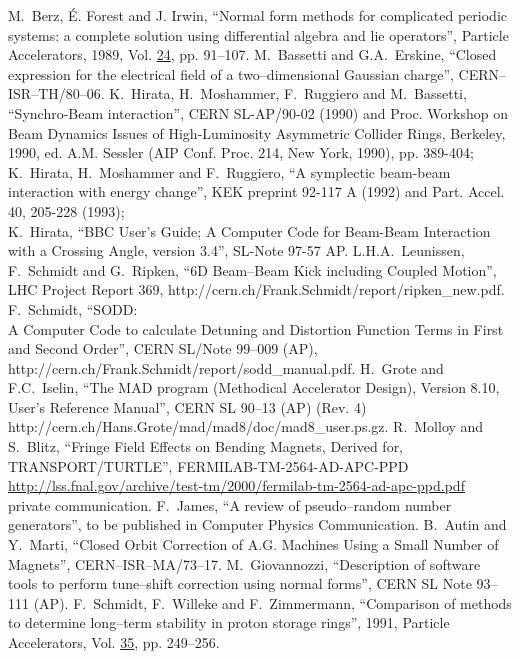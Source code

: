 \begin{thebibliography}{99}
     M.~Berz, \'{E}. Forest
      and J. Irwin, ``Normal form methods for complicated periodic
      systems: a complete solution using differential algebra and lie
      operators'', Particle Accelerators, 1989, Vol. \underline{24}, pp.
      91--107.  
     M.~Bassetti and G.A.~Erskine,
      ``Closed expression for the electrical field of a two--dimensional
      Gaussian charge'', CERN--ISR--TH/80--06.  
     K.~Hirata, H.~Moshammer, F.~Ruggiero and M.~Bassetti,
      ``Synchro-Beam interaction'', CERN SL-AP/90-02 (1990) and Proc.
      Workshop on Beam Dynamics Issues of High-Luminosity Asymmetric
      Collider Rings, Berkeley, 1990, ed. A.M. Sessler (AIP Conf.  Proc.
      214, New York, 1990), pp. 389-404;\\
      K.~Hirata, H.~Moshammer and F.~Ruggiero, ``A symplectic beam-beam
      interaction with energy change'', KEK preprint 92-117 A (1992) and
      Part. Accel. 40, 205-228 (1993);\\
      K.~Hirata, ``BBC User's Guide; A Computer Code for Beam-Beam Interaction 
      with a Crossing Angle, version 3.4'', SL-Note 97-57 AP.
     L.H.A.~Leunissen, F.~Schmidt and G.~Ripken, ``6D
      Beam--Beam Kick including Coupled Motion'', LHC Project Report 369,
      {http://cern.ch/Frank.Schmidt/report/ripken\_new.pdf}.
     F.~Schmidt, ``SODD:\\ A Computer Code to calculate
      Detuning and Distortion Function Terms in First and Second Order'',
      CERN SL/Note 99--009 (AP),
      {http://cern.ch/Frank.Schmidt/report/sodd\_manual.pdf}.
      H.~Grote and F.C.~Iselin, ``The MAD program (Methodical Accelerator
      Design), Version 8.10, User's Reference Manual'', CERN SL 90--13
      (AP) (Rev. 4)\\
      {http://cern.ch/Hans.Grote/mad/mad8/doc/mad8\_user.ps.gz}.
    R.~Molloy and S.~Blitz, ``Fringe Field Effects on Bending Magnets, Derived for, 
    TRANSPORT/TURTLE'', FERMILAB-TM-2564-AD-APC-PPD
    \url{http://lss.fnal.gov/archive/test-tm/2000/fermilab-tm-2564-ad-apc-ppd.pdf}
     private communication.  
     F.~James, ``A review of
      pseudo--random number generators'', to be published in Computer
      Physics Communication.  
     B.~Autin and Y.~Marti, ``Closed Orbit Correction of
      A.G. Machines Using a Small Number of Magnets'',
      CERN--ISR--MA/73--17.
     M.~Giovannozzi,
      ``Description of software tools to perform tune--shift correction
      using normal forms'', CERN SL Note 93--111 (AP).
     F.~Schmidt, F.~Willeke and F.~Zimmermann,
      ``Comparison of methods to determine long--term stability in proton
      storage rings'', 1991, Particle Accelerators, Vol. \underline{35},
      pp. 249--256.  
    

\end{thebibliography}

